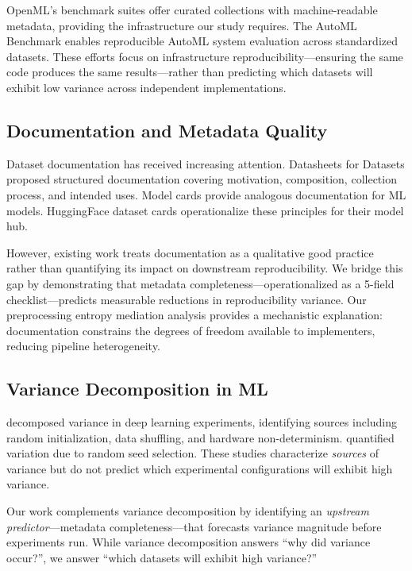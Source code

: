 OpenML's benchmark suites offer curated collections with machine-readable metadata, providing the infrastructure our study requires. The AutoML Benchmark \citep{gijsbers2019automl} enables reproducible AutoML system evaluation across standardized datasets. These efforts focus on infrastructure reproducibility---ensuring the same code produces the same results---rather than predicting which datasets will exhibit low variance across independent implementations.

\subsection{Documentation and Metadata Quality}

Dataset documentation has received increasing attention. Datasheets for Datasets \citep{gebru2021datasheets} proposed structured documentation covering motivation, composition, collection process, and intended uses. Model cards \citep{mitchell2019model} provide analogous documentation for ML models. HuggingFace dataset cards operationalize these principles for their model hub.

However, existing work treats documentation as a qualitative good practice rather than quantifying its impact on downstream reproducibility. We bridge this gap by demonstrating that metadata completeness---operationalized as a 5-field checklist---predicts measurable reductions in reproducibility variance. Our preprocessing entropy mediation analysis provides a mechanistic explanation: documentation constrains the degrees of freedom available to implementers, reducing pipeline heterogeneity.

\subsection{Variance Decomposition in ML}

\citet{bouthillier2021accounting} decomposed variance in deep learning experiments, identifying sources including random initialization, data shuffling, and hardware non-determinism. \citet{picard2021torch} quantified variation due to random seed selection. These studies characterize \emph{sources} of variance but do not predict which experimental configurations will exhibit high variance.

Our work complements variance decomposition by identifying an \emph{upstream predictor}---metadata completeness---that forecasts variance magnitude before experiments run. While variance decomposition answers ``why did variance occur?'', we answer ``which datasets will exhibit high variance?''

